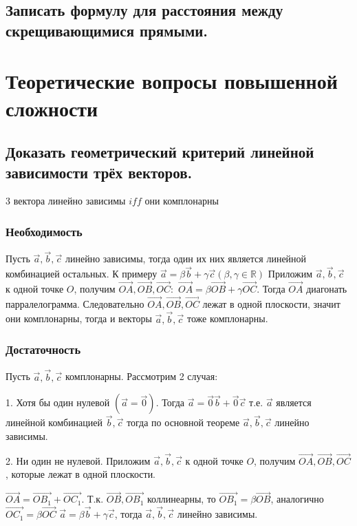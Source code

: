 \documentclass[a4paper, 10pt]{article}
\newcommand{\bvec}[1]{\overrightarrow{#1}}
\newcommand{\image}[2]{
	\begin{figure}[H]
		\center{\texttt{[image: img/\#1]} }
    \end{figure}
}
\begin{document}
\subsection{Записать формулу для расстояния между скрещивающимися прямыми.}

\section{Теоретические вопросы повышенной сложности}

\subsection{Доказать геометрический критерий линейной зависимости трёх векторов.}

3 вектора линейно зависимы $iff$ они комплонарны

\subsubsection{Необходимость}

Пусть $\vec{a}, \vec{b}, \vec{c}$ линейно зависимы, тогда один их них является линейной комбинацией
остальных. К примеру $\vec{a} = \beta\vec{b} + \gamma\vec{c} (\beta,\gamma \in \mathbb{R})$
Приложим $\vec{a}, \vec{b}, \vec{c}$ к одной точке $O$, получим $\bvec{OA}, \bvec{OB}, \bvec{OC}:$
$\bvec{OA} = \beta\bvec{OB} + \gamma\bvec{OC}$. Тогда $\bvec{OA}$ диагонать парралелограмма.
Следовательно $\bvec{OA}, \bvec{OB}, \bvec{OC}$ лежат в одной плоскости, значит они комплонарны,
тогда и векторы $\vec{a}, \vec{b}, \vec{c}$ тоже комплонарны.
\image{3.png}{200}

\subsubsection{Достаточность}

Пусть $\vec{a}, \vec{b}, \vec{c}$ комплонарны. Рассмотрим 2 случая:

1. Хотя бы один нулевой $(\vec{a} = \vec{0})$. Тогда $\vec{a} = \vec{0}\vec{b} + \vec{0}\vec{c}$
т.е. $\vec{a}$ является линейной комбинацией $\vec{b}, \vec{c}$ тогда по основной теореме
$\vec{a}, \vec{b}, \vec{c}$ линейно зависимы. 

2. Ни один не нулевой. Приложим $\vec{a}, \vec{b}, \vec{c}$ к одной точке $O$, 
получим $\bvec{OA}, \bvec{OB}, \bvec{OC}$, которые лежат в одной плоскости.
\image{3.png}{200}
$\bvec{OA} = \bvec{OB_1} + \bvec{OC_1}$. Т.к. $\bvec{OB}, \bvec{OB_1}$ коллинеарны, то
$\bvec{OB_1} = \beta\bvec{OB}$, аналогично $\bvec{OC_1} = \beta\bvec{OC}$ 
$\vec{a} = \beta\vec{b} + \gamma\vec{c}$, тогда $\vec{a}, \vec{b}, \vec{c}$ линейно зависимы.
\end{document}
